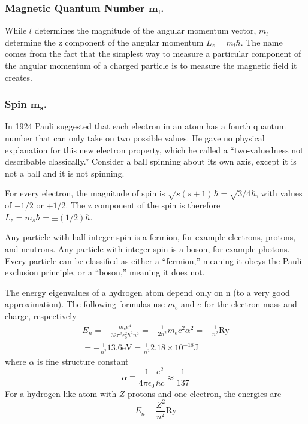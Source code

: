 \documentclass[../../main.tex]{subfiles}
\begin{document}
\subsubsection{Magnetic Quantum Number $\boldsymbol{m_l}$.}  While $l$ determines the magnitude of the angular momentum vector, $m_l$ determine the z component of the angular momentum $L_z = m_l \hbar$. The name comes from the fact that the simplest way to measure a particular component of the angular momentum of a charged particle is to measure the magnetic field it creates.

\subsubsection{Spin $\boldsymbol{m_s}$.} In 1924 Pauli suggested that each electron in an atom has a fourth quantum number that can only take on two possible values. He gave no physical explanation for this new electron property, which he called a “two-valuedness not describable classically.” Consider a ball spinning about its own axis, except it is not a ball and it is not spinning.

For every electron, the magnitude of spin is $\sqrt{s(s + 1)}\hbar=\sqrt{3/4}\hbar$, with values of $-1/2$ or $+1/2$. The z component of the spin is therefore $L_z= m_s\hbar=\pm(1/2)\hbar$.

Any particle with half-integer spin is a fermion, for example electrons, protons, and neutrons. Any particle with integer spin is a boson, for example photons. Every particle can be classified as either a “fermion,” meaning it obeys the Pauli exclusion principle, or a “boson,” meaning it does not. 

The energy eigenvalues of a hydrogen atom depend only on n (to a very good approximation). The  following formulas use $m_e$ and $e$ for the electron mass and charge, respectively
\begin{multline*}
    E_n=-\frac{m_ee^4}{32\pi^2\epsilon_0^2
    \hbar^2n^2}=-\frac{1}{2n^2}m_ec^2\alpha^2 = -\frac{1}{n^2}\text{Ry}\\
    = -\frac{1}{n^2}13.6 \text{eV}=\frac{1}{n^2}2.18\times 10^{-18}\text{J}
\end{multline*}
where $\alpha$ is fine structure constant
\begin{equation*}
    \alpha \equiv \frac{1}{4\pi\epsilon_0}\frac{e^2}{\hbar c}\approx \frac{1}{137}
\end{equation*}
For a hydrogen-like atom with $Z$ protons and one electron, the energies are
\begin{equation*}
    E_n-\frac{Z^2}{n^2}\text{Ry}
\end{equation*}
\end{document}
